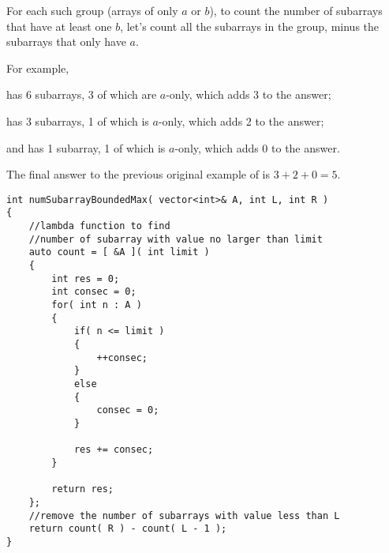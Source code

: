 For each such group (arrays of only $a$ or $b$), to count the number of subarrays that have at least one $b$, let's count all the subarrays in the group, minus the subarrays that only have $a$.

For example, 

\fcj{[a, a, b]} has 6 subarrays, 3 of which are $a$-only, which adds 3 to the answer; 

\fcj{[b, a]} has 3 subarrays, 1 of which is $a$-only, which adds 2 to the answer; 

and \fcj{[0]} has 1 subarray, 1 of which is $a$-only, which adds 0 to the answer. 

The final answer to the previous original example of  is $ 3 + 2 + 0 = 5 $.

\setcounter{lstlisting}{0}
\begin{lstlisting}[style=customc, caption={Count}]
int numSubarrayBoundedMax( vector<int>& A, int L, int R )
{
    //lambda function to find
    //number of subarray with value no larger than limit
    auto count = [ &A ]( int limit )
    {
        int res = 0;
        int consec = 0;
        for( int n : A )
        {
            if( n <= limit )
            {
                ++consec;
            }
            else
            {
                consec = 0;
            }

            res += consec;
        }

        return res;
    };
    //remove the number of subarrays with value less than L
    return count( R ) - count( L - 1 );
}
\end{lstlisting}